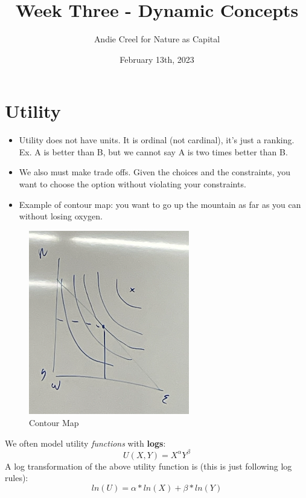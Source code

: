 \documentclass{article}
\title{Week Three - Dynamic Concepts}
\author{Andie Creel for Nature as Capital}
\date{February 13th, 2023}
\begin{document}
\maketitle

\section{Utility}
\begin{itemize}
    \item Utility does not have units. It is ordinal (not cardinal), it's just a ranking. Ex. A is better than B, but we cannot say A is two times better than B. 
    \item We also must make trade offs. Given the choices and the constraints, you want to choose the option without violating your constraints. 
    \item Example of contour map: you want to go up the mountain as far as you can without losing oxygen. 
\end{itemize}

\begin{figure}[htp]
    \centering
    \includegraphics[width=7cm]{contour_map.png}
    \caption{Contour Map}
\end{figure}

We often model utility \textit{functions} with \textbf{logs}:
$$U(X,Y)  = X^\alpha Y^\beta$$
A log transformation of the above utility function is (this is just following log rules):
$$ln(U) = \alpha * ln(X) + \beta * ln(Y)$$
\end{document}
